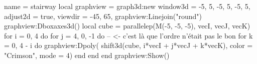 \documentclass[border = 3pt]{standalone}
\begin{document}
\begin{luadraw}{name = stairway}
    local graphview = graph3d:new{
        window3d = {-5, 5, -5, 5, -5, 5},
        adjust2d = true,
        viewdir  = {-45, 65},
    }
    graphview:Linejoin("round")
    graphview:Dboxaxes3d()
    local cube = parallelep(M(-5, -5, -5), vecI, vecJ, vecK)
    for i = 0, 4 do
        for j = 4, 0, -1 do -- <- c'est là que l'ordre n'était pas le bon
            for k = 0, 4 - i do 
                graphview:Dpoly(
                    shift3d(cube, i*vecI + j*vecJ + k*vecK),    
                    {color = "Crimson", mode = 4})
            end
        end
    end
    graphview:Show()
\end{luadraw}
\end{document}
